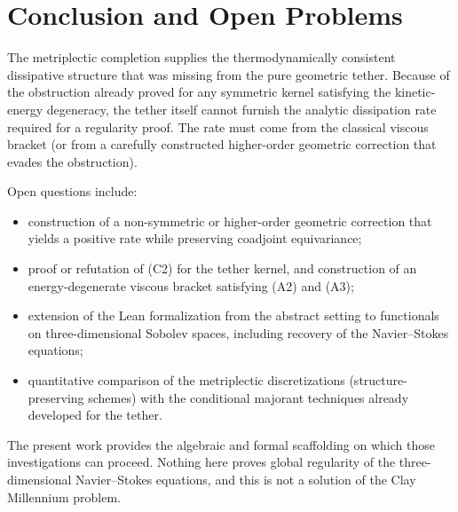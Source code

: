 \documentclass[11pt,a4paper]{article}
\begin{document}
\section{Conclusion and Open Problems}
The metriplectic completion supplies the thermodynamically consistent dissipative structure that was missing from the pure geometric tether. Because of the obstruction already proved for any symmetric kernel satisfying the kinetic-energy degeneracy, the tether itself cannot furnish the analytic dissipation rate required for a regularity proof. The rate must come from the classical viscous bracket (or from a carefully constructed higher-order geometric correction that evades the obstruction). 

Open questions include:
\begin{itemize}
\item construction of a non-symmetric or higher-order geometric correction that yields a positive rate while preserving coadjoint equivariance;
\item proof or refutation of (C2) for the tether kernel, and construction of an energy-degenerate viscous bracket satisfying (A2) and (A3);
\item extension of the Lean formalization from the abstract setting to functionals on three-dimensional Sobolev spaces, including recovery of the Navier--Stokes equations;
\item quantitative comparison of the metriplectic discretizations (structure-preserving schemes) with the conditional majorant techniques already developed for the tether.
\end{itemize}
The present work provides the algebraic and formal scaffolding on which those investigations can proceed. Nothing here proves global regularity of the three-dimensional Navier--Stokes equations, and this is not a solution of the Clay Millennium problem.
\end{document}
